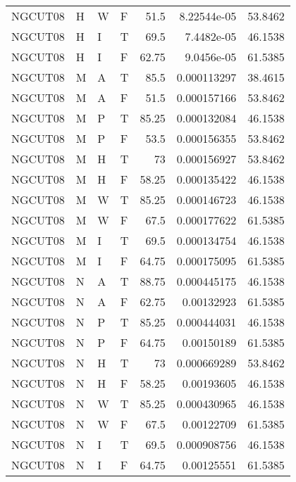 \begin{table}[!htb]
{\begin{tabular}{llllrrr}
            NGCUT08  & H     & W     & F          & 51.5       & 8.22544e-05 & 53.8462  \\
            NGCUT08  & H     & I     & T          & 69.5       & 7.4482e-05  & 46.1538  \\
            NGCUT08  & H     & I     & F          & 62.75      & 9.0456e-05  & 61.5385  \\
            NGCUT08  & M     & A     & T          & 85.5       & 0.000113297 & 38.4615  \\
            NGCUT08  & M     & A     & F          & 51.5       & 0.000157166 & 53.8462  \\
            NGCUT08  & M     & P     & T          & 85.25      & 0.000132084 & 46.1538  \\
            NGCUT08  & M     & P     & F          & 53.5       & 0.000156355 & 53.8462  \\
            NGCUT08  & M     & H     & T          & 73         & 0.000156927 & 53.8462  \\
            NGCUT08  & M     & H     & F          & 58.25      & 0.000135422 & 46.1538  \\
            NGCUT08  & M     & W     & T          & 85.25      & 0.000146723 & 46.1538  \\
            NGCUT08  & M     & W     & F          & 67.5       & 0.000177622 & 61.5385  \\
            NGCUT08  & M     & I     & T          & 69.5       & 0.000134754 & 46.1538  \\
            NGCUT08  & M     & I     & F          & 64.75      & 0.000175095 & 61.5385  \\
            NGCUT08  & N     & A     & T          & 88.75      & 0.000445175 & 46.1538  \\
            NGCUT08  & N     & A     & F          & 62.75      & 0.00132923  & 61.5385  \\
            NGCUT08  & N     & P     & T          & 85.25      & 0.000444031 & 46.1538  \\
            NGCUT08  & N     & P     & F          & 64.75      & 0.00150189  & 61.5385  \\
            NGCUT08  & N     & H     & T          & 73         & 0.000669289 & 53.8462  \\
            NGCUT08  & N     & H     & F          & 58.25      & 0.00193605  & 46.1538  \\
            NGCUT08  & N     & W     & T          & 85.25      & 0.000430965 & 46.1538  \\
            NGCUT08  & N     & W     & F          & 67.5       & 0.00122709  & 61.5385  \\
            NGCUT08  & N     & I     & T          & 69.5       & 0.000908756 & 46.1538  \\
            NGCUT08  & N     & I     & F          & 64.75      & 0.00125551  & 61.5385  \\
            \hline
        \end{tabular}
    }{}
\end{table}